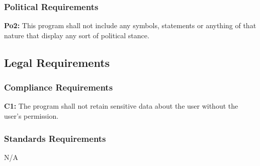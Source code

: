 \documentclass[titlepage]{article}
\begin{document}
\subsubsection{Political Requirements}
\textbf{Po2:} This program shall not include any symbols, statements or anything of that nature that display any sort of political stance.

\subsection{Legal Requirements}
\subsubsection{Compliance Requirements}
\textbf{C1:} The program shall not retain sensitive data about the user without the user's permission.
\subsubsection{Standards Requirements}
N/A
\end{document}
